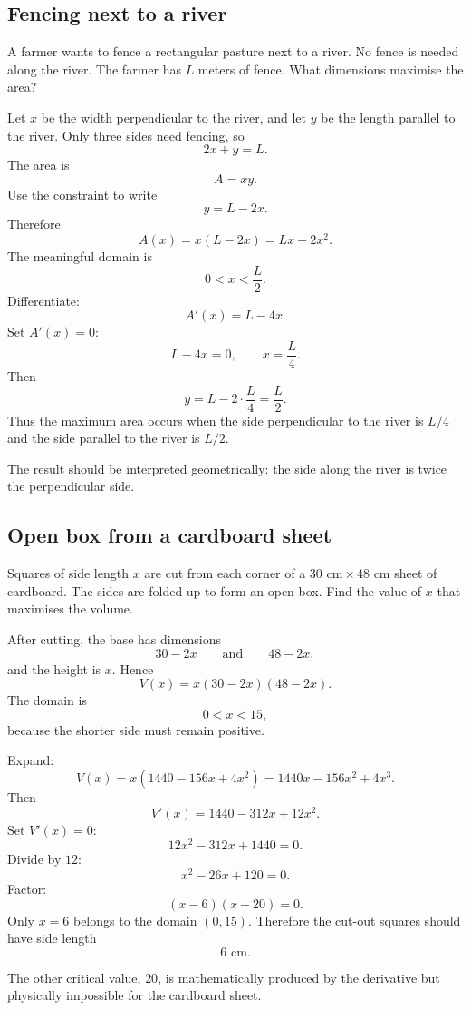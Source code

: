 \subsection*{Fencing next to a river}

\begin{examplebox}
A farmer wants to fence a rectangular pasture next to a river. No fence is needed along the river. The farmer has \(L\) meters of fence. What dimensions maximise the area?

Let \(x\) be the width perpendicular to the river, and let \(y\) be the length parallel to the river. Only three sides need fencing, so
\[
2x+y=L.
\]
The area is
\[
A=xy.
\]
Use the constraint to write
\[
y=L-2x.
\]
Therefore
\[
A(x)=x(L-2x)=Lx-2x^2.
\]
The meaningful domain is
\[
0<x<\frac L2.
\]
Differentiate:
\[
A'(x)=L-4x.
\]
Set \(A'(x)=0\):
\[
L-4x=0,
\qquad
x=\frac L4.
\]
Then
\[
y=L-2\cdot\frac L4=\frac L2.
\]
Thus the maximum area occurs when the side perpendicular to the river is \(L/4\) and the side parallel to the river is \(L/2\).
\end{examplebox}

The result should be interpreted geometrically: the side along the river is twice the perpendicular side.

\subsection*{Open box from a cardboard sheet}

\begin{examplebox}
Squares of side length \(x\) are cut from each corner of a \(30\text{ cm}\times48\text{ cm}\) sheet of cardboard. The sides are folded up to form an open box. Find the value of \(x\) that maximises the volume.

After cutting, the base has dimensions
\[
30-2x
\qquad\text{and}\qquad
48-2x,
\]
and the height is \(x\). Hence
\[
V(x)=x(30-2x)(48-2x).
\]
The domain is
\[
0<x<15,
\]
because the shorter side must remain positive.

Expand:
\[
V(x)=x(1440-156x+4x^2)=1440x-156x^2+4x^3.
\]
Then
\[
V'(x)=1440-312x+12x^2.
\]
Set \(V'(x)=0\):
\[
12x^2-312x+1440=0.
\]
Divide by \(12\):
\[
x^2-26x+120=0.
\]
Factor:
\[
(x-6)(x-20)=0.
\]
Only \(x=6\) belongs to the domain \((0,15)\). Therefore the cut-out squares should have side length
\[
6\text{ cm}.
\]
\end{examplebox}

The other critical value, \(20\), is mathematically produced by the derivative but physically impossible for the cardboard sheet.

